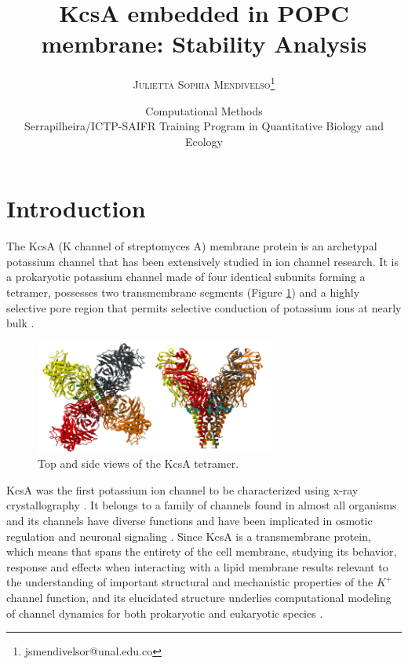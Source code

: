 \documentclass[paper=letter, onecolum, fontsize=12pt]{article}
\title{\vspace{-10mm}\fontsize{21pt}{10pt}\selectfont
\textbf{KcsA embedded in POPC membrane: Stability Analysis}} %
\author{
\large
{\textsc{Julietta Sophia Mendivelso\footnote{jsmendivelsor@unal.edu.co}}}
}
\date{Computational Methods\\
Serrapilheira/ICTP-SAIFR Training Program in Quantitative Biology and Ecology}
\begin{document}
\maketitle
\vspace{-10mm}
\section{Introduction}

\hspace{4mm} The KcsA (K channel of streptomyces A) membrane protein is an archetypal potassium channel that has been extensively studied in ion channel research. It is a prokaryotic potassium channel made of four identical subunits forming a tetramer, possesses two transmembrane segments \cite{schrempf_prokaryotic_1995} (Figure \ref{kcsa}) and a highly selective pore region that permits selective conduction of potassium ions at nearly bulk \cite{aksimentiev_tutorial_nodate}.\\

\begin{figure}[H]
    \centering
    \includegraphics[width=0.7\textwidth]{kcsa_tetra.png}
    \caption{Top and side views of the KcsA tetramer. \cite{aksimentiev_tutorial_nodate}}
    \label{kcsa}
\end{figure}

KcsA was the first potassium ion channel to be characterized using x-ray crystallography \cite{doyle1998structure}. It belongs to a family of channels found in almost all organisms and its channels have diverse functions and have been implicated in osmotic regulation and neuronal signaling \cite{roux_ion_2005}. Since KcsA is a transmembrane protein, which means that spans the entirety of the cell membrane, studying its behavior, response and effects when interacting with a lipid membrane results relevant to the understanding of important structural and mechanistic properties of the $K^+$ channel function, and its elucidated structure underlies computational modeling of channel dynamics for both prokaryotic and eukaryotic species \cite{zhou_kcsa_2001}.\\
\end{document}
